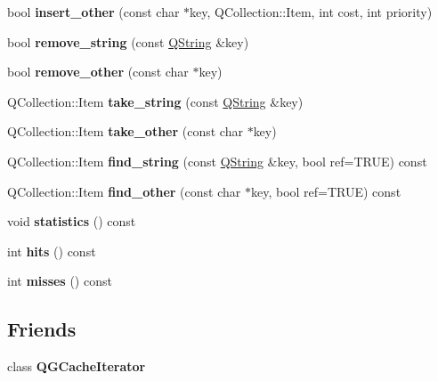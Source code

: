 \begin{DoxyCompactItemize}
\mbox{\label{class_q_g_cache_a2746f839f86692c8b9039cab3128337e}} 
bool {\bfseries insert\+\_\+other} (const char $\ast$key, Q\+Collection\+::\+Item, int cost, int priority)
\item 
\mbox{\label{class_q_g_cache_aff2d410561a6e4b92bdb5d74b48212ad}} 
bool {\bfseries remove\+\_\+string} (const \mbox{\hyperlink{class_q_string}{Q\+String}} \&key)
\item 
\mbox{\label{class_q_g_cache_a56c49e66aeb6b25295200730a0e700d8}} 
bool {\bfseries remove\+\_\+other} (const char $\ast$key)
\item 
\mbox{\label{class_q_g_cache_a4b15c35953469e7fbcddb09745d97b9f}} 
Q\+Collection\+::\+Item {\bfseries take\+\_\+string} (const \mbox{\hyperlink{class_q_string}{Q\+String}} \&key)
\item 
\mbox{\label{class_q_g_cache_aadb5340c0a6678cfa0d8352757b0be93}} 
Q\+Collection\+::\+Item {\bfseries take\+\_\+other} (const char $\ast$key)
\item 
\mbox{\label{class_q_g_cache_ab749680abc1c60faa1584ed81ddcf054}} 
Q\+Collection\+::\+Item {\bfseries find\+\_\+string} (const \mbox{\hyperlink{class_q_string}{Q\+String}} \&key, bool ref=T\+R\+UE) const
\item 
\mbox{\label{class_q_g_cache_acd85ffa485cfca2390451516037ee7fc}} 
Q\+Collection\+::\+Item {\bfseries find\+\_\+other} (const char $\ast$key, bool ref=T\+R\+UE) const
\item 
\mbox{\label{class_q_g_cache_ab2fb9c3ff81484a67507d604569a4060}} 
void {\bfseries statistics} () const
\item 
\mbox{\label{class_q_g_cache_a31764bc570766c4215f986a5be97db71}} 
int {\bfseries hits} () const
\item 
\mbox{\label{class_q_g_cache_a97397b4edc7a4ff8c1cbc20ace392df2}} 
int {\bfseries misses} () const
\end{DoxyCompactItemize}
\subsection*{Friends}
\begin{DoxyCompactItemize}
\item 
\mbox{\label{class_q_g_cache_a37933afdeb94bef86bf66aca84fc229c}} 
class {\bfseries Q\+G\+Cache\+Iterator}
\end{DoxyCompactItemize}
